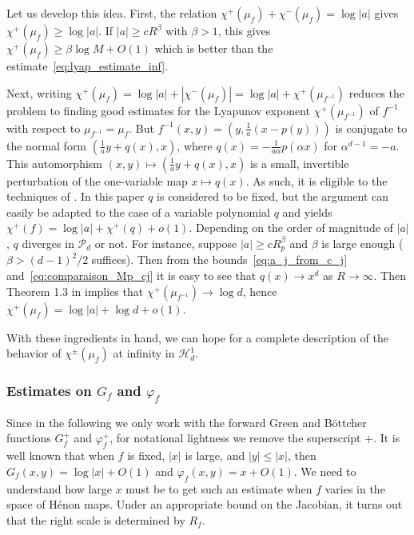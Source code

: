 \documentclass[oneside, 12pt]{amsart}
\newcommand{\abs}[1]{\left\vert#1\right\vert}
\newcommand{\unsur}[1]{\frac{1}{#1}}
\newcommand{\inv}{^{-1}}
\theoremstyle{plain}
\theoremstyle{definition}
\numberwithin{equation}{section}       %
\numberwithin{equation}{section}       %
\begin{document}
 
\begin{vlongue}
Let us develop this idea. 
First, the relation $\chi^+(\mu_f) + \chi^-(\mu_f)  = \log \abs{a}$ gives  $\chi^+(\mu_f)\geq \log\abs{a}$. 
If  $\abs{a}\geq c R^\beta$ with $\beta>1$, this gives $\chi^+(\mu_f)\geq \beta\log M + O(1)$ which is better than the estimate~\eqref{eq:lyap_estimate_inf}. 

Next, writing  
$\chi^+(\mu_f)  = \log\abs{a}  + \abs{\chi^-(\mu_f)}   = \log\abs{a}  + \chi^+(\mu_{f\inv})$ 
reduces the problem to finding good estimates for the Lyapunov exponent $\chi^+(\mu_{f\inv})$ of $f^{-1}$ 
with respect to $\mu_{f\inv} = \mu_f$.
But $f\inv(x,y) = (y, \unsur{a}(x-p(y)))$ is conjugate to the normal form 
$(\unsur{a} y  + q(x), x)$,  where $q(x) =  - \unsur{a\alpha}p(\alpha x)$ for $\alpha^{d-1} = - a$. 
This automorphism $(x,y)\mapsto (\unsur{a} y  + q(x), x)$ is a small, invertible perturbation of the one-variable map $x\mapsto q(x)$. 
As such, it is eligible to the techniques of \cite[\S 3]{lyapunov}. 
In this paper $q$ is considered  to be fixed, 
but  the argument can easily be adapted to the case of a variable polynomial $q$
and yields $\chi^+(f) = \log\abs{a} + \chi^+(q) +o(1)$. 
Depending on the order of magnitude of $\abs{a}$, $q$ diverges in $\mathcal P_d$ or not. 
For instance, suppose $\abs{a}\geq c R_p^\beta$ and $\beta$ is large enough  ($\beta >(d-1)^2/2$ suffices).  Then from the bounds~\eqref{eq:a_j_from_c_j} and~\eqref{eq:comparaison_Mp_cj} 
it is easy to see that $q(x)\to x^d$ as $R\to \infty$. Then Theorem 1.3 in \cite{lyapunov} implies that $\chi^+(\mu_{f\inv})\to \log d$, hence 
$\chi^+(\mu_f)  = \log\abs{a}  +\log d+o(1)$. 

With these ingredients in hand, we can hope for a complete description of the behavior of $\chi^\pm(\mu_f)$ at infinity in $\mathcal H^1_d$. 
\end{vlongue}

\subsubsection{Estimates on $G_f$ and $\varphi_f$}\label{subsub:estimates_varphi}
Since  in the following we only work with the forward Green  and Böttcher functions $G^+_f$ 
and $\varphi^+_f$, for notational lightness we remove the superscript $+$.
It is well known that when $f$ is fixed, $\abs{x}$ is large, and $\abs{y}\leq \abs{x}$, then $G_f(x,y) = \log \abs{x} + O(1)$ and 
$\varphi_f(x,y) = x+O(1)$. 
We need to understand how large $x$ must  be  to get such an estimate when $f$ varies in the space of Hénon maps. 
 Under an appropriate  bound on the Jacobian, it 
  turns out that the right scale is determined by $R_f$.   
\end{document}
